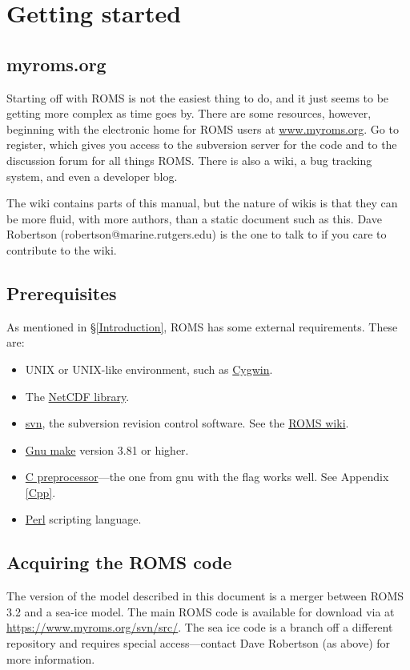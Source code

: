 \section{Getting started}
\label{Starting}

\subsection{myroms.org}
\label{Svn}
Starting off with ROMS is not the easiest thing to do, and it just
seems to be getting more complex as time goes by. There are
some resources, however, beginning with the
electronic home for ROMS users at
\href{http://www.myroms.org}{www.myroms.org}. Go to register,
which gives you access to the subversion server for the code and to
the  discussion forum for all things ROMS. There is also a wiki,
a bug tracking system, and even a developer blog.

The wiki contains parts of this manual, but the nature of wikis is that
they can be more fluid, with more authors, than a static document such
as this. Dave Robertson (robertson@marine.rutgers.edu) is the one to
talk to if you care to contribute to the wiki.

\subsection{Prerequisites}
As mentioned in \S\ref{Introduction}, ROMS has some external
requirements. These are:
\begin{itemize}
    \item UNIX or UNIX-like environment, such as
      \href{http://www.redhat.com/services/custom/cygwin/}{Cygwin}.
    \item The
      \href{http://www.unidata.ucar.edu/software/netcdf/index.html}{NetCDF
      library}.
    \item \href{http://subversion.tigris.org}{svn}, the subversion
      revision control software. See the
      \href{https://www.myroms.org/wiki/index.php/Subversion}{ROMS wiki}.
    \item \href{http://www.gnu.org/software/make/}{Gnu make} version
      3.81 or higher.
    \item \href{http://en.wikipedia.org/wiki/C_preprocessor}{C
      preprocessor}---the one from gnu with the 
      flag works well. See Appendix \ref{Cpp}.
    \item \href{http://www.perl.org}{Perl} scripting language.
\end{itemize}
\subsection{Acquiring the ROMS code}
The version of the model described in this document is a merger between
ROMS 3.2 and a sea-ice model. The main ROMS code is available for
download via  at
\href{https://www.myroms.org/svn/src/}{https://www.myroms.org/svn/src/}.
The sea ice code is a branch off a different repository and requires
special access---contact Dave Robertson (as above) for more information.

